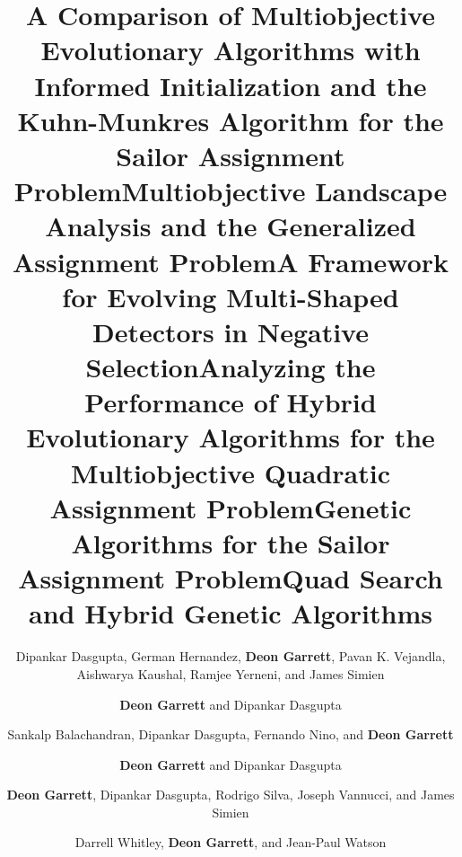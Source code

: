 \documentclass[a4paper,10pt]{cvclean}
\begin{document}
\begin{publications}
\begin{conferencepapers}
\begin{paper}
    \end{paper}
    \begin{paper}
      \title{A Comparison of Multiobjective Evolutionary Algorithms with
        Informed Initialization and the Kuhn-Munkres Algorithm for the Sailor
        Assignment Problem} 
      \author{Dipankar Dasgupta, German Hernandez, \textbf{Deon Garrett}, Pavan
        K. Vejandla, Aishwarya Kaushal, Ramjee Yerneni, and James Simien}
    \end{paper}
    \begin{paper}
      \title{Multiobjective Landscape Analysis and the Generalized Assignment
        Problem}
      \author{\textbf{Deon Garrett} and Dipankar Dasgupta}
    \end{paper}
    \begin{paper}
      \title{A Framework for Evolving Multi-Shaped Detectors in Negative Selection}
      \author{Sankalp Balachandran, Dipankar Dasgupta, Fernando Nino, and \textbf{Deon
        Garrett}}
    \end{paper}
    \begin{paper}
      \title{Analyzing the Performance of Hybrid Evolutionary Algorithms for the
        Multiobjective Quadratic Assignment Problem}
      \author{\textbf{Deon Garrett} and Dipankar Dasgupta}
    \end{paper}
    \begin{paper}
      \title{Genetic Algorithms for the Sailor Assignment Problem}
      \author{\textbf{Deon Garrett}, Dipankar Dasgupta, Rodrigo Silva, Joseph Vannucci,
        and James Simien}
    \end{paper}
    \begin{paper}
      \title{Quad Search and Hybrid Genetic Algorithms}
      \author{Darrell Whitley, \textbf{Deon Garrett}, and Jean-Paul Watson}
    \end{paper}
  \end{conferencepapers}


\end{publications}
\end{document}
